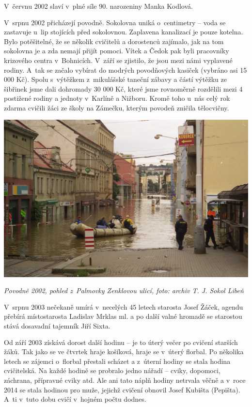 \documentclass[a5paper, 11pt, twoside]{article}
\begin{document}
V~červnu 2002 slaví v~plné síle 90. narozeniny Manka Kodlová.

V~srpnu 2002 přicházejí povodně. Sokolovna uniká o~centimetry -- voda se
zastavuje u~lip stojících před sokolovnou. Zaplavena kanalizací je pouze
kotelna. Bylo potěšitelné, že se několik cvičitelů a dorostenců
zajímalo, jak na tom sokolovna je a zda nemají přijít pomoci. Vítek a
Čedok pak byli pracovníky krizového centra v~Bohnicích. V~září se
zjistilo, že jsou mezi námi vyplavené rodiny. A~tak se začalo vybírat do
modrých povodňových kasiček (vybráno asi 15 000 Kč). Spolu s~výtěžkem
z~mikulášské taneční zábavy a částí výtěžku ze šibřinek jsme dali
dohromady 30 000 Kč, které jsme rovnoměrně rozdělili mezi 4 postižené
rodiny a jednoty v~Karlíně a Nižboru. Kromě toho u~nás celý rok zdarma
cvičili žáci ze školy na Zámečku, kterým povodeň zničila tělocvičny.

 \includegraphics[width=\textwidth]{img/47_povodne.jpg}

\textit{Povodně 2002, pohled z~Palmovky Zenklovou ulicí, foto: archiv T.
J. Sokol Libeň}

V~srpnu 2003 nečekaně umírá v~necelých 45 letech starosta Josef Žáček,
agendu přebírá místostarosta Ladislav Mrklas ml. a po další valné
hromadě se starostou stává dosavadní tajemník Jiří Sixta.

Od září 2003 získává dorost další hodinu -- je to úterý večer po cvičení
starších žáků. Tak jako se ve čtvrtek hraje košíková, hraje se v~úterý
florbal. Po několika letech se zájemci o~florbal přestali scházet a
z~úterní hodiny se stala hodina cvičitelská. Na každé hodině se probralo
jedno nářadí -- cviky, dopomoci, záchrana, přípravné cviky atd. Ale ani
tato náplň hodiny netrvala věčně a v~roce 2014 se stala hodinou pro
muže, jejichž cvičení obnovil Josef Kubišta (Pepišta). A~ti v~tuto dobu
cvičí v~hojném počtu dodnes.
\end{document}
